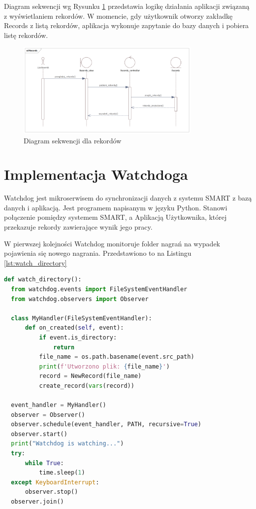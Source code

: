 \documentclass{sprz}
\begin{document}
Diagram sekwencji wg Rysunku \ref{img:sequence_records} przedstawia logikę działania aplikacji związaną z wyświetlaniem rekordów. W momencie, gdy użytkownik otworzy zakładkę Records z listą rekordów, aplikacja wykonuje zapytanie do bazy danych i pobiera listę rekordów.

\begin{figure}[h]
  \centering
  \includegraphics[width=0.8\textwidth]{sprz/sequence_records}
  \caption{Diagram sekwencji dla rekordów}
  \label{img:sequence_records}
\end{figure}

\chapter{Implementacja Watchdoga}

Watchdog jest mikroserwisem do synchronizacji danych z systemu SMART z bazą danych i aplikacją. Jest programem napisanym w języku Python. Stanowi połączenie pomiędzy systemem SMART, a Aplikacją Użytkownika, której przekazuje rekordy zawierające wynik jego pracy. 

W pierwszej kolejności Watchdog monitoruje folder nagrań na wypadek pojawienia się nowego nagrania. Przedstawiono to na Listingu \ref{lst:watch_directory}

\begin{lstlisting}[language=Python,caption={Funkcja służąca do monitorowania folderu z nagraniami}, label={lst:watch_directory}]
  def watch_directory():
  from watchdog.events import FileSystemEventHandler
  from watchdog.observers import Observer

  class MyHandler(FileSystemEventHandler):
      def on_created(self, event):
          if event.is_directory:
              return
          file_name = os.path.basename(event.src_path)
          print(f'Utworzono plik: {file_name}')
          record = NewRecord(file_name)
          create_record(vars(record))

  event_handler = MyHandler()
  observer = Observer()
  observer.schedule(event_handler, PATH, recursive=True)
  observer.start()
  print("Watchdog is watching...")
  try:
      while True:
          time.sleep(1)
  except KeyboardInterrupt:
      observer.stop()
  observer.join()
  \end{lstlisting}
\end{document}
